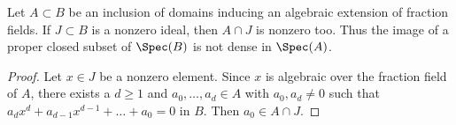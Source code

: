 \begin{lemma}
\label{lemma-intersection-not-zero}
Let $A \subset B$ be an inclusion of domains inducing an algebraic extension
of fraction fields. If $J \subset B$ is a nonzero ideal, then $A \cap J$
is nonzero too. Thus the image of a proper closed subset of $\Spec(B)$
is not dense in $\Spec(A)$.
\end{lemma}

\begin{proof}
Let $x \in J$ be a nonzero element. Since $x$ is algebraic over the fraction
field of $A$, there exists a $d \geq 1$ and $a_0, \ldots, a_d \in A$
with $a_0, a_d \not = 0$ such that
$a_d x^d + a_{d - 1} x^{d - 1} + \ldots + a_0 = 0$ in $B$.
Then $a_0 \in A \cap J$.
\end{proof}